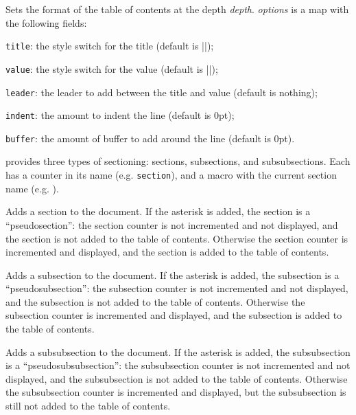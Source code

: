 Sets the format of the table of contents at the depth {\it depth}.
{\it options} is a map with the following fields:
\blist
    \item {\tt title}: the style switch for the title (default is \inlinecode||);
    \item {\tt value}: the style switch for the value (default is \inlinecode||);
    \item {\tt leader}: the leader to add between the title and value (default is nothing);
    \item {\tt indent}: the amount to indent the line (default is 0pt);
    \item {\tt buffer}: the amount of buffer to add around the line (default is 0pt).
\elist
\emacroexp

\pdftoolbox{} provides three types of sectioning: sections, subsections, and subsubsections.
Each has a counter in its name (e.g. {\tt section}), and a macro with the current section name (e.g. \macro\currsection).

Adds a section to the document.
If the asterisk is added, the section is a ``pseudosection'': the section counter is not incremented and not displayed, and the section is not added to the table of contents.
Otherwise the section counter is incremented and displayed, and the section is added to the table of contents.
\emacroexp

Adds a subsection to the document.
If the asterisk is added, the subsection is a ``pseudosubsection'': the subsection counter is not incremented and not displayed, and the subsection is not added to the table of contents.
Otherwise the subsection counter is incremented and displayed, and the subsection is added to the table of contents.
\emacroexp

Adds a subsubsection to the document.
If the asterisk is added, the subsubsection is a ``pseudosubsubsection'': the subsubsection counter is not incremented and not displayed, and the subsubsection is not added to the table of contents.
Otherwise the subsubsection counter is incremented and displayed, but the subsubsection is still not added to the table of contents.
\emacroexp

